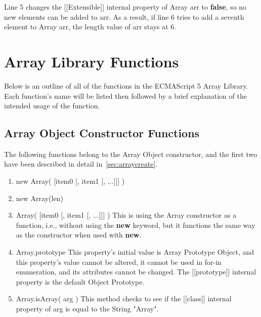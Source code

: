 \documentclass[a4paper,11pt,twoside]{report}
\begin{document}
Line 5 changes the [[Extensible]] internal property of Array arr to \textbf{false}, so no new elements can be added to arr. As a result, if line 6 tries to add a seventh element to Array arr, the length value of arr stays at 6.

\section{Array Library Functions}
Below is an outline of all of the functions in the ECMAScript 5 Array Library. Each function's name will be listed then followed by a brief explanation of the intended usage of the function.

\subsection{Array Object Constructor Functions}
The following functions belong to the Array Object constructor, and the first two have been described in detail in~\ref{sec:arraycreate}.
\begin{enumerate}
\item new Array( [item0 [, item1 [, ...]]] )
\item new Array(len)
\item Array( [item0 [, item1 [, ...]]] ) \newline
This is using the Array constructor as a function, i.e., without using the \textbf{new} keyword, but it functions the same way as the constructor when used with \textbf{new}.
\item Array.prototype \newline
This property's initial value is Array Prototype Object, and this property's value cannot be altered, it cannot be used in for-in enumeration, and its attributes cannot be changed. The [[prototype]] internal property is the default Object Prototype.
\item Array.isArray( arg ) \newline
This method checks to see if the [[class]] internal property of arg is equal to the String "Array".
\end{enumerate}
\end{document}
